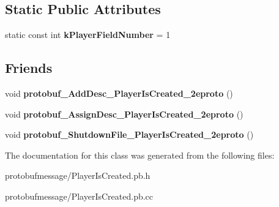 \subsection*{Static Public Attributes}
\begin{DoxyCompactItemize}
\item 
\hypertarget{class_player_is_created_a3269ef8e31ed0329f9f23b97d8cf10c2}{static const int {\bfseries k\-Player\-Field\-Number} = 1}\label{class_player_is_created_a3269ef8e31ed0329f9f23b97d8cf10c2}

\end{DoxyCompactItemize}
\subsection*{Friends}
\begin{DoxyCompactItemize}
\item 
\hypertarget{class_player_is_created_ae862a255429cc902c40be8c48190da6d}{void {\bfseries protobuf\-\_\-\-Add\-Desc\-\_\-\-Player\-Is\-Created\-\_\-2eproto} ()}\label{class_player_is_created_ae862a255429cc902c40be8c48190da6d}

\item 
\hypertarget{class_player_is_created_af53655c5ff0c55c3693040c9e8b18236}{void {\bfseries protobuf\-\_\-\-Assign\-Desc\-\_\-\-Player\-Is\-Created\-\_\-2eproto} ()}\label{class_player_is_created_af53655c5ff0c55c3693040c9e8b18236}

\item 
\hypertarget{class_player_is_created_a99057acd602b2ff282b248946616369b}{void {\bfseries protobuf\-\_\-\-Shutdown\-File\-\_\-\-Player\-Is\-Created\-\_\-2eproto} ()}\label{class_player_is_created_a99057acd602b2ff282b248946616369b}

\end{DoxyCompactItemize}


The documentation for this class was generated from the following files\-:\begin{DoxyCompactItemize}
\item 
protobufmessage/Player\-Is\-Created.\-pb.\-h\item 
protobufmessage/Player\-Is\-Created.\-pb.\-cc\end{DoxyCompactItemize}
